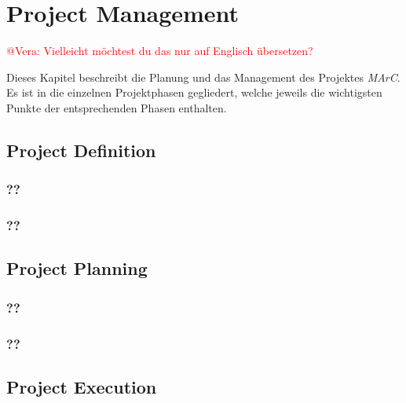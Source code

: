 \section{Project Management} \label{sec:pm}
\textcolor{red}{@Vera: Vielleicht möchtest du das nur auf Englisch übersetzen?}

Dieses Kapitel beschreibt die Planung und das Management des Projektes \textit{MArC}. Es ist in die einzelnen Projektphasen gegliedert, welche jeweils die wichtigsten Punkte der entsprechenden Phasen enthalten.

\subsection{Project Definition} \label{sec:Projectdefinition}

\subsubsection{??}\label{sec:??}

\subsubsection{??}\label{sec:??}



\subsection{Project Planning} \label{sec:ProjectPlanning}

\subsubsection{??}\label{sec:??}

\subsubsection{??}\label{sec:??}




\subsection{Project Execution} \label{sec:ProjectExecution}

